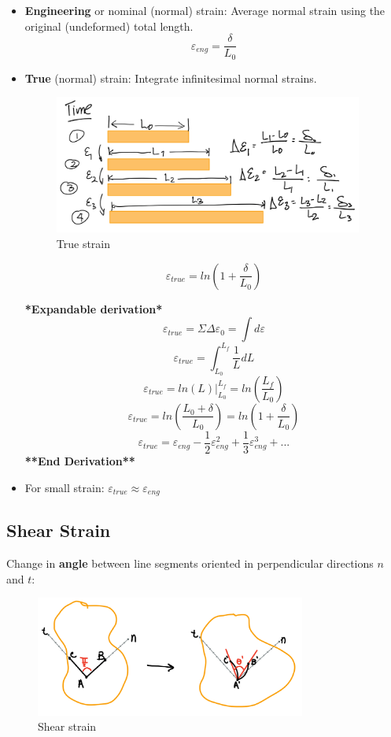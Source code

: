 \begin{itemize}
    \item \textbf{Engineering} or nominal (normal) strain: Average normal strain using the original (undeformed) total length.
    \[ \varepsilon_{eng} = \frac{\delta}{L_0}\] 
    \item \textbf{True} (normal) strain: Integrate infinitesimal normal strains.
    \begin{figure}[!h]
    \centering
    \includegraphics[angle=0, width=4in]{Strain-Figures/True Strain.png}
    \vspace{-2mm}
    \caption{\small True strain}
    \vspace{-3mm}
    \label{Fig:True Strain}
    \end{figure}

    \[ \varepsilon_{true} = ln(1 + \frac{\delta}{L_0})\]

     \textbf{*Expandable derivation*}
    \[ \varepsilon_{true} = \Sigma\Delta\varepsilon_0 = \int d\varepsilon\]
    \[ \varepsilon_{true} = \int_{L_0}^{L_f}\frac{1}{L}dL\]
    \[ \varepsilon_{true} = ln(L)|_{L_0}^{L_f} = ln(\frac{L_f}{L_0}) \]
    \[ \varepsilon_{true} = ln(\frac{L_0+\delta}{L_0}) = ln(1+\frac{\delta}{L_0})\]
    \[ \varepsilon_{true} = \varepsilon_{eng}-\frac{1}{2}\varepsilon_{eng}^2 + \frac{1}{3}\varepsilon_{eng}^{3} + ...\]
    \textbf{**End Derivation**}
    \item For small strain: $\varepsilon_{true} \approx \varepsilon_{eng}$
\end{itemize}

\subsection{Shear Strain}
Change in \textbf{angle} between line segments oriented in perpendicular directions $n$ and $t$:

\begin{figure}[!h]
\centering
\includegraphics[angle=0, width=3.5in]{Strain-Figures/Shear Strain.png}
\vspace{-2mm}
\caption{\small Shear strain}
\vspace{-3mm}
\label{Fig:Shear Strain}
\end{figure}

